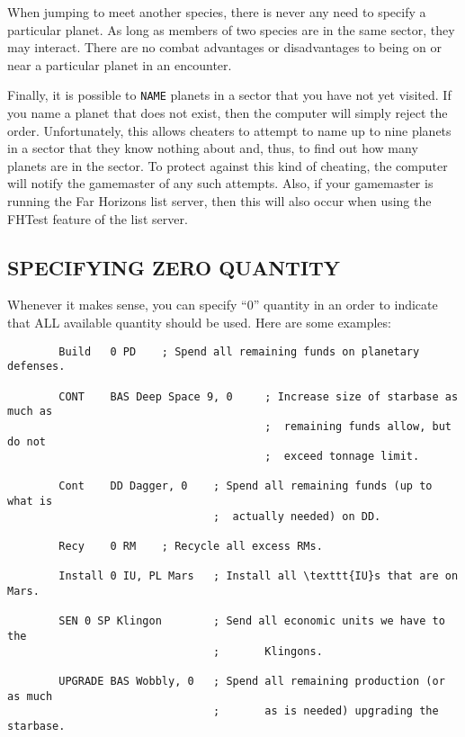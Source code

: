 \documentclass[10pt,titlepage]{article}
\begin{document}
When jumping to meet another species, there is never any need to specify a
particular planet.  As long as members of two species are in the same sector,
they may interact.  There are no combat advantages or disadvantages to being
on or near a particular planet in an encounter.

Finally, it is possible to \texttt{NAME} planets in a sector that you have not yet
visited.  If you name a planet that does not exist, then the computer will
simply reject the order.  Unfortunately, this allows cheaters to attempt to
name up to nine planets in a sector that they know nothing about and, thus, to
find out how many planets are in the sector.  To protect against this kind of
cheating, the computer will notify the gamemaster of any such attempts.  Also,
if your gamemaster is running the Far Horizons list server, then this will also
occur when using the FHTest feature of the list server.


\subsection{SPECIFYING ZERO QUANTITY}
\label{sec:specifyingzero}


Whenever it makes sense, you can specify ``0'' quantity in an order to indicate
that ALL available quantity should be used.  Here are some examples:

\begin{verbatim}
        Build   0 PD    ; Spend all remaining funds on planetary defenses.

        CONT    BAS Deep Space 9, 0     ; Increase size of starbase as much as
                                        ;  remaining funds allow, but do not
                                        ;  exceed tonnage limit.

        Cont    DD Dagger, 0    ; Spend all remaining funds (up to what is
                                ;  actually needed) on DD.

        Recy    0 RM    ; Recycle all excess RMs.

        Install 0 IU, PL Mars   ; Install all \texttt{IU}s that are on Mars.

        SEN 0 SP Klingon        ; Send all economic units we have to the
                                ;       Klingons.

        UPGRADE BAS Wobbly, 0   ; Spend all remaining production (or as much
                                ;       as is needed) upgrading the starbase.\end{verbatim} 
\end{document}
